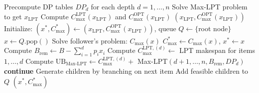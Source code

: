 \begin{algorithm}
\caption{Branch-and-Bound with Max-LPT Upper Bound}
\label{alg:bnb-maxlpt}
\begin{algorithmic}[1]
\State Precompute DP tables $DP_d$ for each depth $d=1, \ldots, n$
\State Solve Max-LPT problem to get $x_{\text{LPT}}$
\State Compute $C_{\max}^{\text{LPT}}(x_{\text{LPT}})$ and $C_{\max}^{\text{OPT}}(x_{\text{LPT}})$
    \State \Return $(x_{\text{LPT}}, C_{\max}^{\text{OPT}}(x_{\text{LPT}}))$ 
\EndIf
\State Initialize: $(x^*, C_{\max}^*) \gets (x_{\text{LPT}}, C_{\max}^{\text{OPT}}(x_{\text{LPT}}))$, queue $Q \gets \{$root node$\}$
    \State $x \gets Q.\text{pop}()$ 
        \State Solve follower's problem: $C_{\max}(x)$
            \State $C_{\max}^* \gets C_{\max}(x)$, $x^* \gets x$ 
        \EndIf
    \Else
        \State Compute $B_{\text{rem}} \gets B - \sum_{i=1}^{d} p_i x_i$ 
        \State Compute $C_{\max}^{\text{LPT},(d)} \gets$ LPT makespan for items $1, \ldots, d$
        \State Compute $\text{UB}_{\text{Max-LPT}} \gets C_{\max}^{\text{LPT},(d)} +$ Max-LPT$(d+1, \ldots, n, B_{\text{rem}}, DP_d)$
            \State \textbf{continue} 
        \EndIf
        \State Generate children by branching on next item
        \State Add feasible children to $Q$
    \EndIf
\EndWhile
\State \Return $(x^*, C_{\max}^*)$
\end{algorithmic}
\end{algorithm}